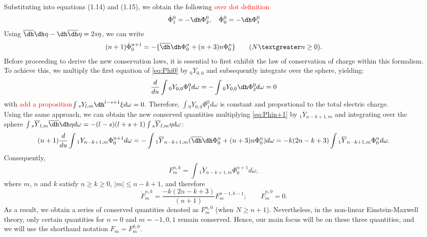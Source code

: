 Substituting into equations (1.14) and (1.15), we obtain the following \textcolor{red}{over dot definition}
\begin{equation}\label{eq:Phi0}
  \dot{\Phi}_{1}^{0} = -\dh\Phi_{2}^{0}, \quad \dot{\Phi}_{0}^{0} = -\dh \Phi_{1}^{0}
\end{equation}
Using  $\overline{\dh}\dh \eta - \dh \overline{\dh} \eta = 2s\eta$, we can write
\begin{equation}\label{eq:Phin+1}
  (n + 1)\dot{\Phi}_{0}^{n+1} = -\{\overline{\dh}\dh \Phi_{0}^{n} + (n+3)n\Phi_{0}^{n}\} \qquad (N \textgreater n \geq 0).
\end{equation}
Before proceeding to derive the new conservation laws, it is essential to first exhibit the law of conservation of charge within this formalism. To achieve this, we multiply the first equation of \eqref{eq:Phi0} by $_{0}Y_{0,0}$ and subsequently integrate over the sphere, yielding:
\begin{equation}\label{eq:YPhi0}
  \frac{d}{du} \int {_{0}Y_{0,0}\Phi_{1}^{0} d\omega} = - \int {_{0}Y_{0,0}\dh \Phi_{2}^{0} d\omega} = 0
\end{equation}
with \textcolor{red}{add a proposition}$\int{_{s}Y_{l,m}\dh^{l-s+1}\xi d\omega} = 0$. Therefore, $\int {_{0}Y_{0,0}\Phi_{1}^{0} d\omega}$ is constant and proportional to the total electric charge.\\
Using the same approach, we can obtain the new conserved quantities multiplying \eqref{eq:Phin+1} by $_{1}\overline{Y}_{n-k+1,m}$ and integrating over the sphere $\int {_{s}\overline{Y}_{l,m}\overline{\dh}\dh \eta d \omega} = -(l-s)(l+s+1) \int{_{s}\overline{Y}_{l,m}\eta d\omega}$:
\begin{equation}\label{eq:Eleccharge}
  (n+1)\frac{d}{du}\int{_{1}Y_{n-k+1,m}\Phi_{0}^{n+1} d\omega} = - \int{_{1}\overline{Y}_{n-k+1,m}(\overline{\dh}\dh \Phi_{0}^{n}+(n+3)n\Phi_{0}^{n})d\omega} = -k(2n-k+3)\int{_{1}\overline{Y}_{n-k+1,m}\Phi_{0}^{n} d\omega}.
\end{equation}
Consequently,
\begin{equation}\label{eq:F}
  F_{m}^{n,k} = \int{_{1}\overline{Y}_{n-k+1,m}\Phi_{0}^{n+1} d\omega},
\end{equation}
where $m$, $n$ and $k$ satisfy $n \geq k \geq 0$, $|m| \leq n-k+1$, and therefore 
\begin{equation}\label{eq:Fdot}
  \dot{F}_{m}^{n,k} = \frac{-k(2n-k+3)}{(n+1)}F_{m}^{n-1,k-1} ; \qquad \dot{F}_{m}^{n,0} = 0.
\end{equation}
As a result, we obtain a series of conserved quantities denoted as $F_{m}^{n,0}$ (when $N \geq n+1$). Nevertheless, in the non-linear Einstein-Maxwell theory, only certain quantities for $n = 0$ and $m = -1, 0, 1$ remain conserved. Hence, our main focus will be on these three quantities, and we will use the shorthand notation $F_{m} = F_{m}^{0,0}$.\\
